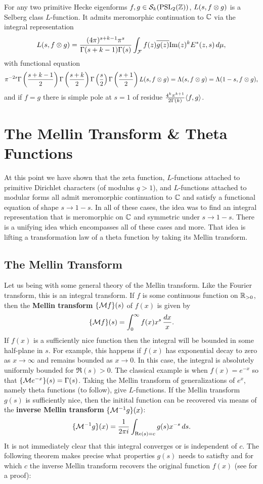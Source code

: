       \begin{theorem}
        For any two primitive Hecke eigenforms $f,g \in \mathcal{S}_{k}(\mathrm{PSL}_{2}(\mathbb{Z}))$, $L(s,f \otimes g)$ is a Selberg class $L$-function. It admits meromorphic continuation to $\mathbb{C}$ via the integral representation
        \[
          L(s,f \otimes g) = \frac{(4\pi)^{s+k-1}\pi^{s}}{\Gamma(s+k-1)\Gamma(s)}\int_{\mathcal{F}}f(z)\overline{g(z)}\mathrm{Im}(z)^{k}E^{\ast}(z,s)\,d\mu,
        \]
        with functional equation
        \[
          \pi^{-2s}\Gamma\left(\frac{s+k-1}{2}\right)\Gamma\left(\frac{s+k}{2}\right)\Gamma\left(\frac{s}{2}\right)\Gamma\left(\frac{s+1}{2}\right)L(s,f \otimes g) = \Lambda(s,f \otimes g) = \Lambda(1-s,f \otimes g),
        \]
        and if $f = g$ there is simple pole at $s = 1$ of residue $\frac{4^{k}\pi^{k+1}}{2\Gamma(k)}\langle f,g\rangle$.
      \end{theorem}
  \section{The Mellin Transform \& Theta Functions}
    At this point we have shown that the zeta function, $L$-functions attached to primitive Dirichlet characters (of modulus $q > 1$), and $L$-functions attached to modular forms all admit meromorphic continuation to $\mathbb{C}$ and satisfy a functional equation of shape $s \to 1-s$. In all of these cases, the idea was to find an integral representation that is meromorphic on $\mathbb{C}$ and symmetric under $s \to 1-s$. There is a unifying idea which encompasses all of these cases and more. That idea is lifting a transformation law of a theta function by taking its Mellin transform.
    \subsection*{The Mellin Transform}
      Let us being with some general theory of the Mellin transform. Like the Fourier transform, this is an integral transform. If $f$ is some continuous function on $\mathbb{R}_{>0}$, then the \textbf{Mellin transform} $\{\mathcal{M}f\}(s)$ of $f(x)$ is given by
      \[
        \{\mathcal{M}f\}(s) = \int_{0}^{\infty}f(x)x^{s}\,\frac{dx}{x}.
      \]
      If $f(x)$ is a sufficiently nice function then the integral will be bounded in some half-plane in $s$. For example, this happens if $f(x)$ has exponential decay to zero as $x \to \infty$ and remains bounded as $x \to 0$. In this case, the integral is absolutely uniformly bounded for $\Re(s) > 0$. The classical example is when $f(x) = e^{-x}$ so that $\{\mathcal{M}e^{-x}\}(s) = \Gamma(s)$. Taking the Mellin transform of generalizations of $e^{x}$, namely theta functions (to follow), give $L$-functions. If the Mellin transform $g(s)$ is sufficiently nice, then the initital function can be recovered via means of the \textbf{inverse Mellin transform} $\{\mathcal{M}^{-1}g\}(x)$:
      \[
        \{\mathcal{M}^{-1}g\}(x) = \frac{1}{2\pi i}\int_{\mathrm{Re}(s) = c}g(s)x^{-s}\,ds.
      \]
      It is not immediately clear that this integral converges or is independent of $c$. The following theorem makes precise what properties $g(s)$ needs to satisfty and for which $c$ the inverse Mellin transform recovers the original function $f(x)$ (see \cite{debnath2016integral} for a proof):

